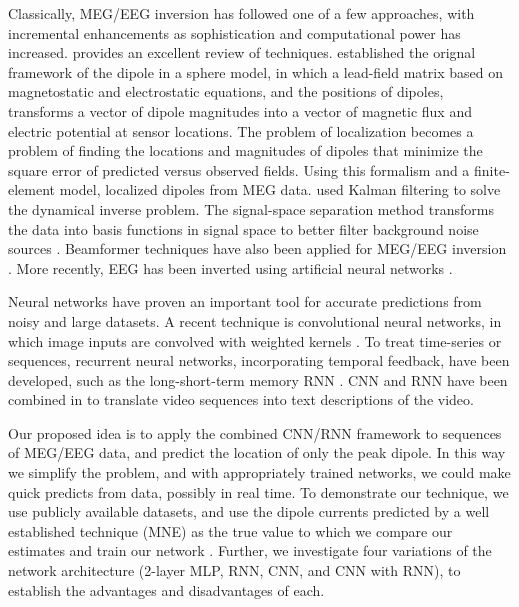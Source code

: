 \documentclass[journal]{IEEEtran}
\begin{document}
Classically, MEG/EEG inversion has followed one of a few approaches, with incremental enhancements as sophistication and computational power has increased. \cite{grech2008review} provides an excellent review of techniques. \cite{mosher1992multiple} established the orignal framework of the dipole in a sphere model, in which a lead-field matrix based on magnetostatic and electrostatic equations, and the positions of dipoles, transforms a vector of dipole magnitudes into a vector of magnetic flux and electric potential at sensor locations. The problem of localization becomes a problem of finding the locations and magnitudes of dipoles that minimize the square error of predicted versus observed fields. Using this formalism and a finite-element model, \cite{buchner1997inverse} localized dipoles from MEG data. \cite{galka2004solution} used Kalman filtering to solve the dynamical inverse problem. The signal-space separation method transforms the data into basis functions in signal space to better filter background noise sources \cite{taulu2005applications}. Beamformer techniques have also been applied for MEG/EEG inversion \cite{sekihara2001reconstructing}. More recently, EEG has been inverted using artificial neural networks \cite{van2000eeg}.


Neural networks have proven an important tool for accurate predictions from noisy and large datasets. A recent technique is convolutional neural networks, in which image inputs are convolved with weighted kernels \cite{lecun1998gradient}. To treat time-series or sequences, recurrent neural networks, incorporating temporal feedback, have been developed, such as the long-short-term memory RNN \cite{hochreiter1997long}. CNN and RNN have been combined in \cite{venugopalan2014translating} to translate video sequences into text descriptions of the video.


Our proposed idea is to apply the combined CNN/RNN framework to sequences of MEG/EEG data, and predict the location of only the peak dipole. In this way we simplify the problem, and with appropriately trained networks, we could make quick predicts from data, possibly in real time. To demonstrate our technique, we use publicly available datasets, and use the dipole currents predicted by a well established technique (MNE) as the true value to which we compare our estimates and train our network \cite{gramfort2014mne}. Further, we investigate four variations of the network architecture (2-layer MLP, RNN, CNN, and CNN with RNN), to establish the advantages and disadvantages of each.
\end{document}
